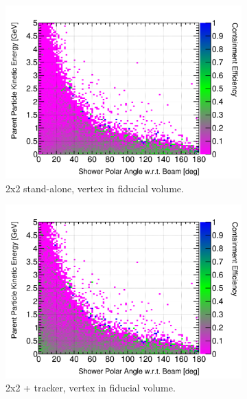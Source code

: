 \documentclass[10pt,a4paper,openany]{article}
\begin{document}
\begin{figure}[htbp]
\begin{subfigure}[b]{0.49\textwidth}
    \includegraphics[width=1.0\textwidth]{Pi0_cont_eff_2x2_fiducial.png}
		\caption{2x2 stand-alone, vertex in fiducial volume.}
		\label{}
	\end{subfigure}	
	\hfill
	\begin{subfigure}[b]{0.49\textwidth}
		\centering
		\includegraphics[width=1.0\textwidth]{Pi0_cont_eff_2x2_Scintillator_fiducial_gap.png}
		\caption{2x2 + tracker, vertex in fiducial volume.}
		\label{}
	\end{subfigure}
	\begin{subfigure}[b]{0.49\textwidth}
		\centering

\end{subfigure}
\end{figure}
\end{document}
